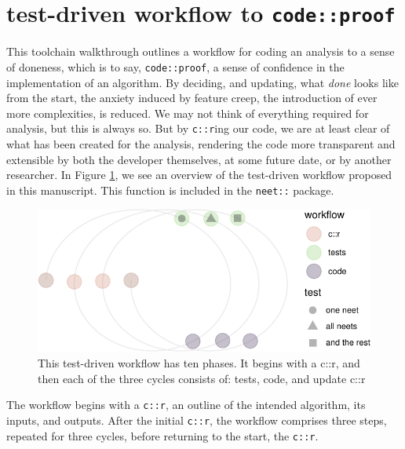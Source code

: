 \documentclass[
]{article}
\begin{document}
\hypertarget{test-driven-workflow-to-codeproof}{%
\section{\texorpdfstring{test-driven workflow to \texttt{code::proof}}{test-driven workflow to code::proof}}\label{test-driven-workflow-to-codeproof}}

This toolchain walkthrough outlines a workflow for coding an analysis to a sense of doneness, which is to say, \texttt{code::proof}, a sense of confidence in the implementation of an algorithm. By deciding, and updating, what \emph{done} looks like from the start, the anxiety induced by feature creep, the introduction of ever more complexities, is reduced. We may not think of everything required for analysis, but this is always so. But by \texttt{c::r}ing our code, we are at least clear of what has been created for the analysis, rendering the code more transparent and extensible by both the developer themselves, at some future date, or by another researcher. In Figure \ref{fig:workflow}, we see an overview of the test-driven workflow proposed in this manuscript. This function is included in the \texttt{neet::} package.

\begin{figure}

{\centering \includegraphics{when-is-done-done_files/figure-latex/workflow-1} 

}

\caption{This test-driven workflow has ten phases. It begins with a c::r, and then each of the three cycles consists of: tests, code, and update c::r}\label{fig:workflow}
\end{figure}

The workflow begins with a \texttt{c::r}, an outline of the intended algorithm, its inputs, and outputs. After the initial \texttt{c::r}, the workflow comprises three steps, repeated for three cycles, before returning to the start, the \texttt{c::r}.
\end{document}
